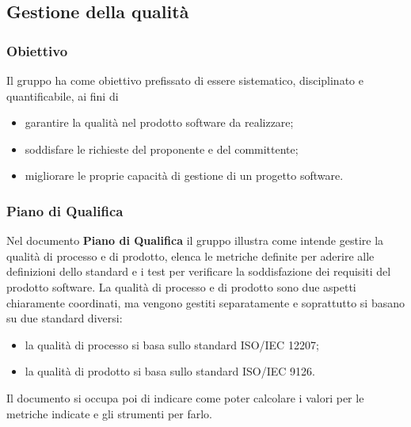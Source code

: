 \subsection{Gestione della qualità}
\subsubsection{Obiettivo}
Il gruppo \Gruppo{} ha come obiettivo prefissato di essere sistematico, disciplinato e quantificabile, ai fini di 
\begin{itemize}
    \item garantire la qualità nel prodotto software da realizzare;
    \item soddisfare le richieste del proponente e del committente;
    \item migliorare le proprie capacità di gestione di un progetto software.
\end{itemize}

\subsubsection{Piano di Qualifica}
Nel documento \textbf{Piano di Qualifica} il gruppo illustra come intende gestire la qualità di processo e di prodotto, elenca le metriche definite per aderire alle definizioni dello standard e i test per verificare la soddisfazione dei requisiti del prodotto software.
La qualità di processo e di prodotto sono due aspetti chiaramente coordinati, ma vengono gestiti separatamente e soprattutto si basano su due standard diversi:
\begin{itemize}
    \item la qualità di processo si basa sullo standard ISO/IEC 12207;
    \item la qualità di prodotto si basa sullo standard ISO/IEC 9126.
\end{itemize}
Il documento si occupa poi di indicare come poter calcolare i valori per le metriche indicate e gli strumenti per farlo.